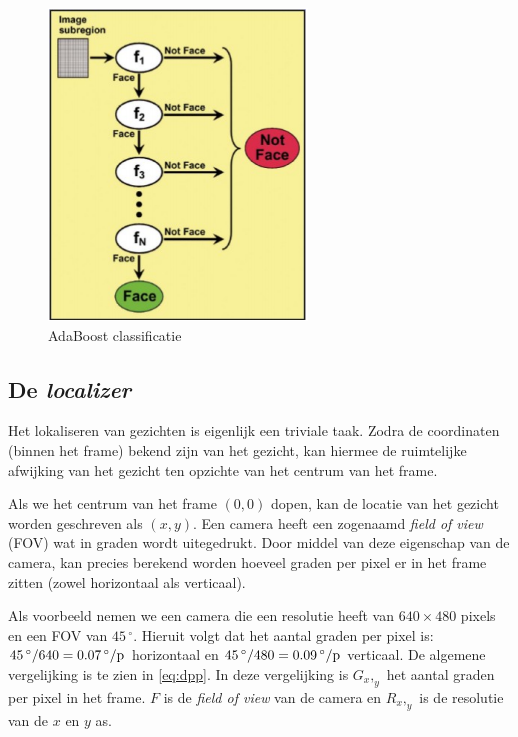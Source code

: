 \begin{figure}[H]
    \begin{center}
        \includegraphics[scale=0.75]{figures/adaboost-classification.png}
        \caption{AdaBoost classificatie}
    \end{center}
\end{figure}

\subsection{De \emph{localizer}}

Het lokaliseren van gezichten is eigenlijk een triviale taak. Zodra de coordinaten
(binnen het frame) bekend zijn van het gezicht, kan hiermee de ruimtelijke
afwijking van het gezicht ten opzichte van het centrum van het frame.

Als we het centrum van het frame $(0, 0)$ dopen, kan de locatie van het gezicht
worden geschreven als $(x, y)$. Een camera heeft een zogenaamd
\emph{field of view} (FOV) wat in graden wordt uitegedrukt. Door middel van deze
eigenschap van de camera, kan precies berekend worden hoeveel graden per pixel
er in het frame zitten (zowel horizontaal als verticaal).

Als voorbeeld nemen we een camera die een resolutie heeft van $640 \times 480$
pixels en een FOV van $45\,^{\circ}$. Hieruit volgt dat het aantal graden per pixel
is: $45\,^{\circ} / 640 = 0.07{\rm \,^{\circ}/p}$ horizontaal en
$45\,^{\circ} / 480 = 0.09{\rm \,^{\circ}/p}$ verticaal. De algemene vergelijking
is te zien in \ref{eq:dpp}. In deze vergelijking is $G_x,_y$ het aantal graden
per pixel in het frame. $F$ is de \emph{field of view} van de camera en $R_x,_y$
is de resolutie van de $x$ en $y$ as.

